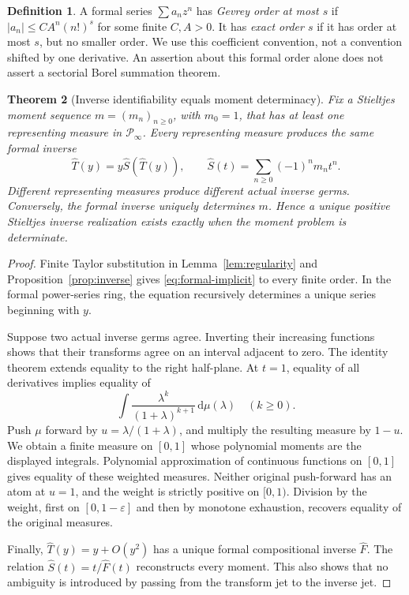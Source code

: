 \documentclass[11pt,a4paper]{article}
\numberwithin{equation}{section}
\newtheorem{theorem}{Theorem}[section]
\theoremstyle{definition}
\newtheorem{definition}[theorem]{Definition}
\theoremstyle{remark}
\newcommand{\dd}{\,\mathrm d}
\begin{document}
\begin{definition}
A formal series \(\sum a_nz^n\) has \emph{Gevrey order at most \(s\)}
if \(|a_n|\le CA^n(n!)^s\) for some finite \(C,A>0\). It has
\emph{exact order \(s\)} if it has order at most \(s\), but no smaller
order. We use this coefficient convention, not a convention shifted by
one derivative. An assertion about this formal order alone does not
assert a sectorial Borel summation theorem.
\end{definition}

\begin{theorem}[Inverse identifiability equals moment determinacy]
\label{thm:identifiability}
Fix a Stieltjes moment sequence \(m=(m_n)_{n\ge0}\), with \(m_0=1\),
that has at least one representing measure in \(\mathcal P_\infty\).
Every representing measure produces the same formal inverse
\begin{equation}
 \widehat T(y)=y\widehat S(\widehat T(y)),
 \qquad \widehat S(t)=\sum_{n\ge0}(-1)^nm_nt^n.
 \label{eq:formal-implicit}
\end{equation}
Different representing measures produce different actual inverse germs.
Conversely, the formal inverse uniquely determines \(m\). Hence a
unique positive Stieltjes inverse realization exists exactly when the
moment problem is determinate.
\end{theorem}
\begin{proof}
Finite Taylor substitution in Lemma~\ref{lem:regularity} and
Proposition~\ref{prop:inverse} gives \eqref{eq:formal-implicit} to every
finite order. In the formal power-series ring, the equation recursively
determines a unique series beginning with \(y\).

Suppose two actual inverse germs agree. Inverting their increasing
functions shows that their transforms agree on an interval adjacent to
zero. The identity theorem extends equality to the right half-plane.
At \(t=1\), equality of all derivatives implies equality of
\[
 \int\frac{\lambda^k}{(1+\lambda)^{k+1}}\dd\mu(\lambda)
 \quad(k\ge0).
\]
Push \(\mu\) forward by \(u=\lambda/(1+\lambda)\), and multiply the
resulting measure by \(1-u\). We obtain a finite measure on \([0,1]\)
whose polynomial moments are the displayed integrals. Polynomial
approximation of continuous functions on \([0,1]\) gives equality of
these weighted measures. Neither original push-forward has an atom at
\(u=1\), and the weight is strictly positive on \([0,1)\). Division by
the weight, first on \([0,1-\varepsilon]\) and then by monotone
exhaustion, recovers equality of the original measures.

Finally, \(\widehat T(y)=y+O(y^2)\) has a unique formal compositional
inverse \(\widehat F\). The relation
\(\widehat S(t)=t/\widehat F(t)\) reconstructs every moment. This also
shows that no ambiguity is introduced by passing from the transform jet
to the inverse jet.
\end{proof}
\end{document}
